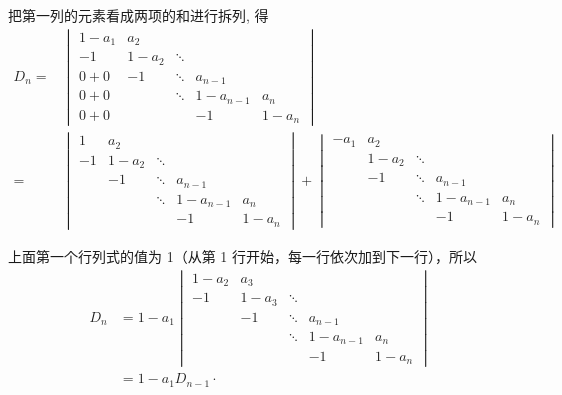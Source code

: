 \begin{solution}
    把第一列的元素看成两项的和进行拆列, 得
    \begin{align*}
        D_n= & \begin{vmatrix}
                   1-a_{1} & a_{2}   &        &           &         \\
                   -1      & 1-a_{2} & \ddots &           &         \\
                   0 + 0   & -1      & \ddots & a_{n-1}   &         \\
                   0 + 0   &         & \ddots & 1-a_{n-1} & a_{n}   \\
                   0 + 0   &         &        & -1        & 1-a_{n}
               \end{vmatrix}         \\
        =    & \begin{vmatrix}
                   1  & a_{2}   &        &           &         \\
                   -1 & 1-a_{2} & \ddots &           &         \\
                      & -1      & \ddots & a_{n-1}   &         \\
                      &         & \ddots & 1-a_{n-1} & a_{n}   \\
                      &         &        & -1        & 1-a_{n}
               \end{vmatrix} + \begin{vmatrix}
                                   -a_{1} & a_{2}   &        &           &         \\
                                          & 1-a_{2} & \ddots &           &         \\
                                          & -1      & \ddots & a_{n-1}   &         \\
                                          &         & \ddots & 1-a_{n-1} & a_{n}   \\
                                          &         &        & -1        & 1-a_{n}
                               \end{vmatrix}
    \end{align*}

    上面第一个行列式的值为 1（从第 1 行开始，每一行依次加到下一行），所以
    \[ \begin{aligned}
            D_n & =1-a_{1}\begin{vmatrix}
                              1-a_{2} & a_{3}   &        &           &         \\
                              -1      & 1-a_{3} & \ddots &           &         \\
                                      & -1      & \ddots & a_{n-1}   &         \\
                                      &         & \ddots & 1-a_{n-1} & a_{n}   \\
                                      &         &        & -1        & 1-a_{n}
                          \end{vmatrix} \\
                & =1-a_{1} D_{n-1} \cdot
        \end{aligned} \]


\end{solution}
